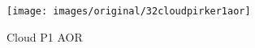 \begin{figure}[!h] 
\centering 
\texttt{[image: images/original/32cloudpirker1aor]}
\caption{Cloud P1 AOR}
\label{fig:32cloudpirker1aor} 
\end{figure}

